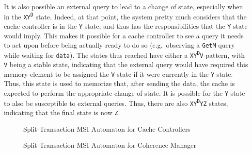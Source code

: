 It is also possible an external query to lead to a change of state, especially
when in the \texttt{XY\textsuperscript{D}} state. Indeed, at that point, the
system pretty much considers that the cache controller is in the \texttt{Y}
state, and thus has the responsibilities that the \texttt{Y} state would imply.
This makes it possible for a cache controller to see a query it needs to act
upon before being actually ready to do so (e.g.~observing a \texttt{GetM} query
while waiting for \texttt{data}). The states thus reached have either a
\texttt{XY\textsuperscript{D}V} pattern, with \texttt{V} being a stable state,
indicating that the external query would have required this memory element to be
assigned the \texttt{V} state if it were currently in the \texttt{Y} state.
Thus, this state is used to memorize that, after sending the data, the cache is
expected to perform the appropriate change of state. It is possible for
the \texttt{Y} state to also be susceptible to external queries. Thus, there
are also \texttt{XY\textsuperscript{D}YZ} states, indicating that the final
state is now \texttt{Z}.

\begin{figure}
\begin{center}

\end{center}
\caption{Split-Transaction MSI Automaton for Cache Controllers}
\label{fig:msi_cc_table}
\end{figure}
%

\begin{figure}
\begin{center}

\end{center}
\caption{Split-Transaction MSI Automaton for Coherence Manager}
\label{fig:msi_mgr_table}
\end{figure}

